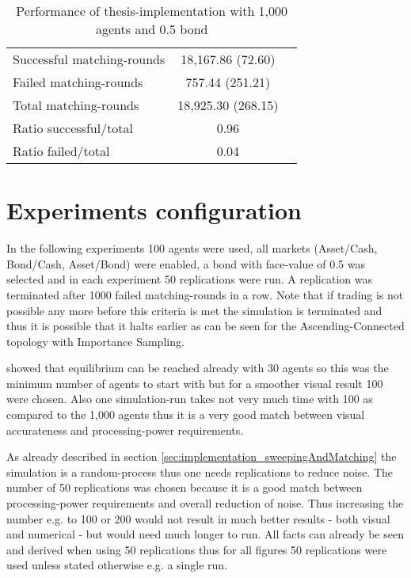 \documentclass[Bachelorarbeit.tex]{subfiles}
\begin{document}
\begin{table}[H]
	\centering
	\caption{Performance of thesis-implementation with 1,000 agents and 0.5 bond}
	\begin{tabular} { l c r }
		\hline
		Successful matching-rounds & 18,167.86 (72.60) \\
		Failed matching-rounds & 757.44 (251.21) \\
		Total matching-rounds & 18,925.30 (268.15) \\
		\hline
		Ratio successful/total & 0.96 \\
		Ratio failed/total & 0.04 \\
		\hline
	\end{tabular}
\end{table}

\section{Experiments configuration}
In the following experiments 100 agents were used, all markets (Asset/Cash, Bond/Cash, Asset/Bond) were enabled, a bond with face-value of 0.5 was selected and in each experiment 50 replications were run. A replication was terminated after 1000 failed matching-rounds in a row. Note that if trading is not possible any more before this criteria is met the simulation is terminated and thus it is possible that it halts earlier as can be seen for the Ascending-Connected topology with Importance Sampling.

\bigskip 

\cite{Breuer2015} showed that equilibrium can be reached already with 30 agents so this was the minimum number of agents to start with but for a smoother visual result 100 were chosen. Also one simulation-run takes not very much time with 100 as compared to the 1,000 agents thus it is a very good match between visual accurateness and processing-power requirements.

\medskip

As already described in section \ref{sec:implementation_sweepingAndMatching} the simulation is a random-process thus one needs replications to reduce noise. The number of 50 replications was chosen because it is a good match between processing-power requirements and overall reduction of noise. Thus increasing the number e.g. to 100 or 200 would not result in much better results - both visual and numerical - but would need much longer to run. All facts can already be seen and derived when using 50 replications thus for all figures 50 replications were used unless stated otherwise e.g. a single run.
\end{document}
